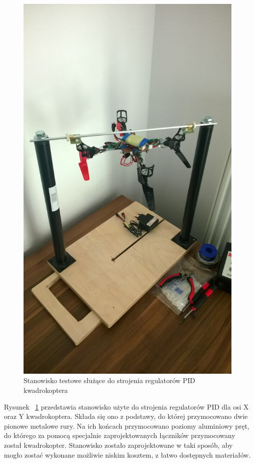 \begin{figure}[H]
	\centering
	\includegraphics[scale=0.15]{Pictures/QuadroTestStation.jpg}
	\caption[Stanowisko testowe służące do strojenia regulatorów PID kwadrokoptera]{Stanowisko testowe służące do strojenia regulatorów PID kwadrokoptera}
	\label{fig:QuadroTestStation}
\end{figure}

Rysunek ~\ref{fig:QuadroTestStation} przedstawia stanowisko użyte do strojenia regulatorów PID dla osi X oraz Y kwadrokoptera. Składa się ono z podstawy, do której przymocowano dwie pionowe metalowe rury. Na ich końcach przymocowano poziomy aluminiowy pręt, do którego za pomocą specjalnie zaprojektowanych łączników przymocowany został kwadrokopter. Stanowisko zostało zaprojektowane w taki sposób, aby mogło zostać wykonane możliwie niskim kosztem, z łatwo dostępnych materiałów.  

